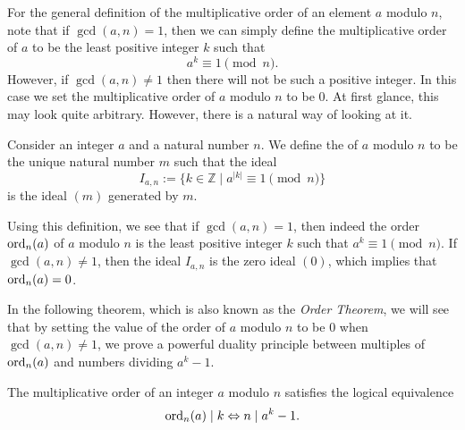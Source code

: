 
For the general definition of the multiplicative order of an element $a$ modulo $n$, note that if $\gcd(a,n)=1$, then we can simply define the multiplicative order of $a$ to be the least positive integer $k$ such that
\begin{equation*}
  a^k\equiv 1\pmod{n}.
\end{equation*}
However, if $\gcd(a,n)\neq 1$ then there will not be such a positive integer. In this case we set the multiplicative order of $a$ modulo $n$ to be $0$. At first glance, this may look quite arbitrary. However, there is a natural way of looking at it.

\begin{definition}
  Consider an integer $a$ and a natural number $n$. We define the  of $a$ modulo $n$ to be the unique natural number $m$ such that the ideal
  \begin{equation*}
    I_{a,n}:=\{k\in\mathbb{Z}\mid a^{|k|} \equiv 1\pmod{n}\}
  \end{equation*}
  is the ideal $(m)$ generated by $m$.
\end{definition}

Using this definition, we see that if $\gcd(a,n)=1$, then indeed the order $\operatorname{ord}_n(a)$ of $a$ modulo $n$ is the least positive integer $k$ such that $a^k\equiv 1\pmod{n}$. If $\gcd(a,n)\neq 1$, then the ideal $I_{a,n}$ is the zero ideal $(0)$, which implies that $\operatorname{ord}_n(a)=0$.

In the following theorem, which is also known as the \emph{Order Theorem}, we will see that by setting the value of the order of $a$ modulo $n$ to be $0$ when $\gcd(a,n)\neq 1$, we prove a powerful duality principle between multiples of $\operatorname{ord}_n(a)$ and numbers dividing $a^k-1$.

\begin{theorem}\label{theorem:order-theorem}
  The multiplicative order of an integer $a$ modulo $n$ satisfies the logical equivalence
  \begin{equation*}
    \operatorname{ord}_n(a)\mid k \Leftrightarrow n \mid a^k-1.
  \end{equation*}
\end{theorem}

